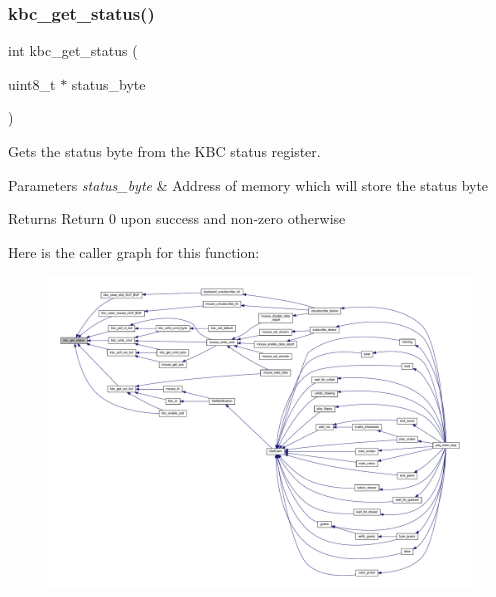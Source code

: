 \subsubsection{\texorpdfstring{kbc\+\_\+get\+\_\+status()}{kbc\_get\_status()}}
{\footnotesize\ttfamily int kbc\+\_\+get\+\_\+status (\begin{DoxyParamCaption}\item[{uint8\+\_\+t $\ast$}]{status\+\_\+byte }\end{DoxyParamCaption})}



Gets the status byte from the K\+BC status register. 


\begin{DoxyParams}{Parameters}
{\em status\+\_\+byte} & Address of memory which will store the status byte \\
\hline
\end{DoxyParams}
\begin{DoxyReturn}{Returns}
Return 0 upon success and non-\/zero otherwise 
\end{DoxyReturn}
Here is the caller graph for this function\+:\nopagebreak
\begin{figure}[H]
\begin{center}
\leavevmode
\includegraphics[width=350pt]{group__keyboard_ga54c1dc87fd33a133b8c1eaf08bc51a99_icgraph}
\end{center}
\end{figure}
\mbox{\label{group__keyboard_ga8348b9b1e74639dd7edf7e939ea2e1d1}} 
